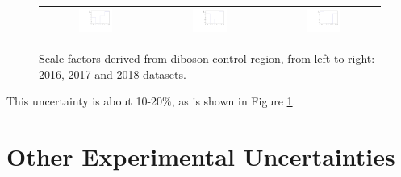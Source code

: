 \begin{figure}[tbh!]
 \begin{center}
 \begin{tabular}{ccc}
  \includegraphics[width=0.325\textwidth]{figures/Part3/Systematics/2016_VV_Sys_1D}&
    \includegraphics[width=0.325\textwidth]{figures/Part3/Systematics/2017_VV_Sys_1D}&
  \includegraphics[width=0.325\textwidth]{figures/Part3/Systematics/2018_VV_Sys_1D}\\
 \end{tabular}
 \caption{Scale factors derived from diboson control region, from left to right: 2016, 2017 and 2018 datasets.}
 \label{fig:SF_VV}
 \end{center}
\end{figure}

This uncertainty is about 10-20$\%$, as is shown in Figure \ref{fig:SF_VV}.
\section{Other Experimental Uncertainties}
\label{sec:OthUnc}

